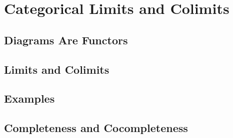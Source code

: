 \chapter{Categorical Limits and Colimits}

\section{Diagrams Are Functors}



\section{Limits and Colimits}



\section{Examples}










\section{Completeness and Cocompleteness}

